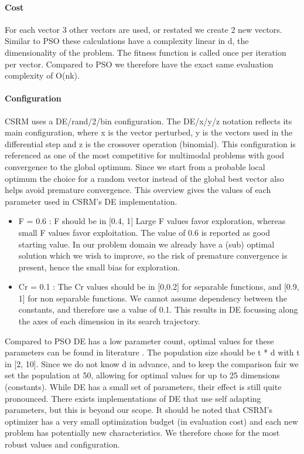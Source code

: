 \paragraph{Cost}\label{decost}
For each vector 3 other vectors are used, or restated we create 2 new vectors. Similar to PSO these calculations have a complexity linear in d, the dimensionality of the problem. The fitness function is called once per iteration per vector. Compared to PSO we therefore have the exact same evaluation complexity of O(nk).

\paragraph{Configuration}\label{DEConfig}
CSRM uses a DE/rand/2/bin configuration. The DE/x/y/z notation reflects its main configuration, where x is the vector perturbed, y is the vectors used in the differential step and z is the crossover operation (binomial). This configuration is referenced \cite{DE} as one of the most competitive for multimodal problems with good convergence to the global optimum. Since we start from a probable local optimum the choice for a random vector instead of the global best vector also helps avoid premature convergence.
This overview gives the values of each parameter used in CSRM's DE implementation.
\begin{itemize}
\item F = 0.6 : F should be in [0.4, 1] Large F values favor exploration, whereas small F values favor exploitation. The value of 0.6 is reported as good starting value. In our problem domain we already have a (sub) optimal solution which we wish to improve, so the risk of premature convergence is present, hence the small bias for exploration. 
\item Cr = 0.1 : The Cr values should be in [0,0.2] for separable functions, and [0.9, 1] for non separable functions. We cannot assume dependency between the constants, and therefore use a value of 0.1. This results in DE focussing along the axes of each dimension in its search trajectory. 
\end{itemize}
Compared to PSO DE has a low parameter count, optimal values for these parameters can be found in literature \cite{DESurveyLatest}. The population size should be t * d with t in [2, 10]. Since we do not know d in advance, and to keep the comparison fair we set the population at 50, allowing for optimal values for up to 25 dimensions (constants).
While DE has a small set of parameters, their effect is still quite pronounced. There exists implementations of DE that use self adapting parameters, but this is beyond our scope. It should be noted that CSRM's optimizer has a very small optimization budget (in evaluation cost) and each new problem has potentially new characteristics. We therefore chose for the most robust values and configuration.